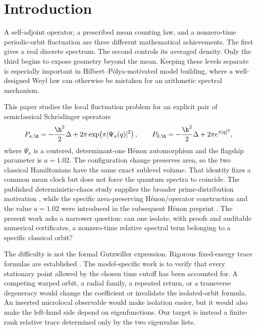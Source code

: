 \section{Introduction}
\label{sec:introduction}

A self-adjoint operator, a prescribed mean counting law, and a nonzero-time
periodic-orbit fluctuation are three different mathematical achievements.
The first gives a real discrete spectrum.  The second controls its averaged
density.  Only the third begins to expose geometry beyond the mean.  Keeping
these levels separate is especially important in Hilbert--P\'olya-motivated
model building, where a well-designed Weyl law can otherwise be mistaken for
an arithmetic spectral mechanism.

This paper studies the local fluctuation problem for an explicit pair of
semiclassical Schr\"odinger operators
\begin{equation}
 P_{a,\h}=-\frac{\h^2}{2}\Delta+
 2\pi\exp\!\left(\pi|\Psi_a(q)|^2\right),
 \qquad
 P_{0,\h}=-\frac{\h^2}{2}\Delta+2\pi e^{\pi|q|^2},
 \label{eq:intro-pair}
\end{equation}
where \(\Psi_a\) is a centered, determinant-one H\'enon automorphism and the
flagship parameter is \(a=1.02\).  The configuration change preserves area,
so the two classical Hamiltonians have the same exact sublevel volume.  That
identity fixes a common mean clock but does not force the quantum spectra to
coincide.  The published deterministic-chaos study supplies the broader
prime-distribution motivation \citep{Wang2026PrimeChaos}, while the specific
area-preserving H\'enon/operator construction and the value \(a=1.02\) were
introduced in the subsequent H\'enon preprint
\citep{Wang2026HenonPreprint}.  The present work asks a
narrower question: can one isolate, with proofs and auditable numerical
certificates, a nonzero-time relative spectral term belonging to a specific
classical orbit?

The difficulty is not the formal Gutzwiller expression.  Rigorous
fixed-energy trace formulas are established
\citep{DuistermaatGuillemin1975,BrummelhuisUribe1991,PaulUribe1995,CombescureRalstonRobert1999}.
The model-specific work is to verify that every stationary point allowed by
the chosen time cutoff has been accounted for.  A competing warped orbit, a
radial family, a repeated return, or a transverse degeneracy would change
the coefficient or invalidate the isolated-orbit formula.  An inserted
microlocal observable would make isolation easier, but it would also make the
left-hand side depend on eigenfunctions.  Our target is instead a finite-rank
relative trace determined only by the two eigenvalue lists.

